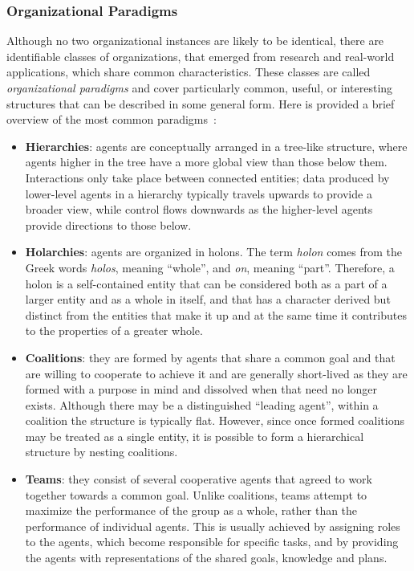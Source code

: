 \subsubsection{Organizational Paradigms}
Although no two organizational instances are likely to be identical, there are identifiable classes of organizations, that emerged from research and real-world applications, which share common characteristics.
These classes are called \textit{organizational paradigms} and cover particularly common, useful, or interesting structures that can be described in some general form.
Here is provided a brief overview of the most common paradigms~\cite{horling_lesser_2004}:
\begin{itemize}
    \item \textbf{Hierarchies}: agents are conceptually arranged in a tree-like structure, where agents higher in the tree have a more global view than those below them.
    Interactions only take place between connected entities; data produced by lower-level agents in a hierarchy typically travels upwards to provide a broader view, while control flows downwards as the higher-level agents provide directions to those below.
    \item \textbf{Holarchies}: agents are organized in holons.
    The term \textit{holon} comes from the Greek words \textit{holos}, meaning ``whole'', and \textit{on}, meaning ``part''. Therefore, a holon is a self-contained entity that can be considered both as a part of a larger entity and as a whole in itself, and that has a character derived but distinct from the entities that make it up and at the same time it contributes to the properties of a greater whole.
    \item \textbf{Coalitions}: they are formed by agents that share a common goal and that are willing to cooperate to achieve it and are generally short-lived as they are formed with a purpose in mind and dissolved when that need no longer exists.
    Although there may be a distinguished ``leading agent'', within a coalition the structure is typically flat.
    However, since once formed coalitions may be treated as a single entity, it is possible to form a hierarchical structure by nesting coalitions.
    \item \textbf{Teams}: they consist of several cooperative agents that agreed to work together towards a common goal.
    Unlike coalitions, teams attempt to maximize the performance of the group as a whole, rather than the performance of individual agents.
    This is usually achieved by assigning roles to the agents, which become responsible for specific tasks, and by providing the agents with representations of the shared goals, knowledge and plans.

\end{itemize}
